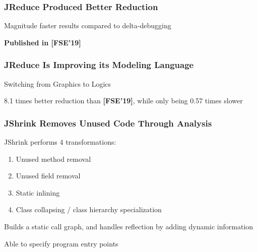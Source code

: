 \documentclass[aspectratio=169]{beamer}
\begin{document}
  \begin{frame}
    \frametitle{JReduce Produced Better Reduction}


    \vspace{-2em}

    Magnitude faster results compared to delta-debugging

    \vspace{2em}

    \textbf{Published in [FSE'19]}
  \end{frame}

  \begin{frame}
    \frametitle{JReduce Is Improving its Modeling Language}


    Switching from Graphics to Logics

    \vspace{2em}

    8.1 times better reduction than \textbf{[FSE'19]}, while only being 0.57
    times slower
  \end{frame}

  \begin{frame}
    \frametitle{JShrink Removes Unused Code Through Analysis}

    JShrink performs 4 transformations:
    \begin{enumerate}
      \item Unused method removal
      \item Unused field removal
      \item Static inlining
      \item Class collapsing / class hierarchy specialization
    \end{enumerate}

    \vspace{2em}

    Builds a static call graph, and handles reflection by adding dynamic
    information

    \vspace{2em}

    Able to specify program entry points
  \end{frame}
\end{document}

